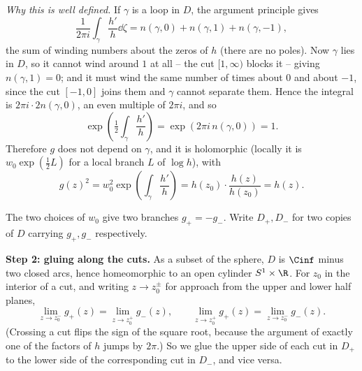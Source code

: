 \begin{center}
\end{center}

\emph{Why this is well defined.} If $\gamma$ is a loop in $D$, the argument principle
gives
$$
\frac{1}{2\pi i}\int_\gamma \frac{h'}{h}\dd\zeta = n(\gamma, 0) + n(\gamma,1) + n(\gamma,-1),
$$
the sum of winding numbers about the zeros of $h$ (there are no poles). Now $\gamma$ lies
in $D$, so it cannot wind around $1$ at all -- the cut $[1,\infty)$ blocks it -- giving
$n(\gamma,1) = 0$; and it must wind the same number of times about $0$ and about $-1$,
since the cut $[-1,0]$ joins them and $\gamma$ cannot separate them. Hence the integral is
$2\pi i \cdot 2n(\gamma,0)$, an even multiple of $2\pi i$, and so
$$
\exp\left(\tfrac12 \int_\gamma \frac{h'}{h}\right) = \exp(2\pi i \, n(\gamma,0)) = 1.
$$
Therefore $g$ does not depend on $\gamma$, and it is holomorphic (locally it is
$w_0 \exp(\frac12 L)$ for a local branch $L$ of $\log h$), with
$$
g(z)^2 = w_0^2 \exp\left(\int_\gamma \frac{h'}{h}\right) = h(z_0)\cdot \frac{h(z)}{h(z_0)} = h(z).
$$

The two choices of $w_0$ give two branches $g_+ = -g_-$. Write $D_+, D_-$ for two copies
of $D$ carrying $g_+, g_-$ respectively.

\vspace{0.4em}
\textbf{Step 2: gluing along the cuts.} As a subset of the sphere, $D$ is $\Cinf$ minus
two closed arcs, hence homeomorphic to an open cylinder $S^1 \times \R$. For
$z_0$ in the interior of a cut, and writing $z \to z_0^{\pm}$ for approach from the upper
and lower half planes,
$$
\lim_{z \to z_0^-} g_+(z) = \lim_{z\to z_0^+} g_-(z), \qquad
\lim_{z\to z_0^+} g_+(z) = \lim_{z\to z_0^-} g_-(z).
$$
(Crossing a cut flips the sign of the square root, because the argument of exactly one of
the factors of $h$ jumps by $2\pi$.) So we glue the upper side of each cut in $D_+$ to the
lower side of the corresponding cut in $D_-$, and vice versa.

